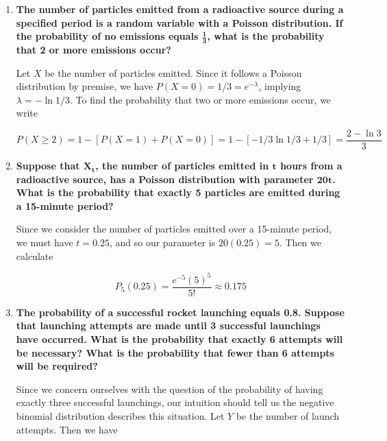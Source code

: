 \documentclass[10pt, oneside]{article}
\begin{document}
\begin{enumerate}[label=8.\arabic*]
\begin{proof}
\end{proof}

\item  \begin{tcolorbox}[
  colback=Cerulean!5!white,
  colframe=Cerulean!75!black]
\textbf{The number of particles emitted from a radioactive source during a specified period is a random variable with a Poisson distribution. If the probability of no emissions equals $\bm{\frac{1}{3}}$, what is the probability that 2 or more emissions occur?}
\end{tcolorbox}

Let $X$ be the number of particles emitted. Since it follows a Poisson distribution by premise, we have $P(X = 0) = 1/3 = e^{-\lambda}$, implying $\lambda = - \ln 1/3$. To find the probability that two or more emissions occur, we write

\[ P(X \geq 2) = 1 - [P(X = 1) + P(X = 0)] = 1 - [-1/3 \ln 1/3 + 1/3] = \boxed{\frac{2 - \ln 3}{3} } \]

\item  \begin{tcolorbox}[
  colback=Cerulean!5!white,
  colframe=Cerulean!75!black]
\textbf{Suppose that $\bm{X_t}$, the number of particles emitted in $\bm{t}$ hours from a radioactive source, has a Poisson distribution with parameter $\bm{20t}$. What is the probability that exactly 5 particles are emitted during a 15-minute period?}
\end{tcolorbox}

Since we consider the number of particles emitted over a 15-minute period, we must have $t = 0.25$, and so our parameter is $20(0.25) = 5$. Then we calculate

\[ P_5 (0.25) = \frac{e^{-5} (5)^5 }{5!} \approx \boxed{0.175} \]

\item  \begin{tcolorbox}[
  colback=Cerulean!5!white,
  colframe=Cerulean!75!black]
\textbf{The probability of a successful rocket launching equals 0.8. Suppose that launching attempts are made until 3 successful launchings have occurred. What is the probability that exactly 6 attempts will be necessary? What is the probability that fewer than 6 attempts will be required?}
\end{tcolorbox}

Since we concern ourselves with the question of the probability of having exactly three successful launchings, our intuition should tell us the negative binomial distribution describes this situation. Let $Y$ be the number of launch attempts. Then we have


\end{enumerate}
\end{document}
